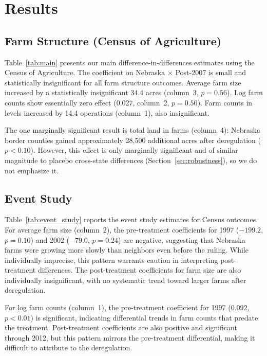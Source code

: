 \documentclass[12pt]{article}
\begin{document}
\section{Results}\label{sec:results}

\subsection{Farm Structure (Census of Agriculture)}

Table~\ref{tab:main} presents our main difference-in-differences estimates using the Census of Agriculture. The coefficient on Nebraska $\times$ Post-2007 is small and statistically insignificant for all farm structure outcomes. Average farm size increased by a statistically insignificant 34.4 acres (column~3, $p = 0.56$). Log farm counts show essentially zero effect (0.027, column~2, $p = 0.50$). Farm counts in levels increased by 14.4 operations (column~1), also insignificant.

The one marginally significant result is total land in farms (column~4): Nebraska border counties gained approximately 28,500 additional acres after deregulation ($p < 0.10$). However, this effect is only marginally significant and of similar magnitude to placebo cross-state differences (Section~\ref{sec:robustness}), so we do not emphasize it.



\subsection{Event Study}

Table~\ref{tab:event_study} reports the event study estimates for Census outcomes. For average farm size (column~2), the pre-treatment coefficients for 1997 ($-199.2$, $p = 0.10$) and 2002 ($-79.0$, $p = 0.24$) are negative, suggesting that Nebraska farms were growing more slowly than neighbors even before the ruling. While individually imprecise, this pattern warrants caution in interpreting post-treatment differences. The post-treatment coefficients for farm size are also individually insignificant, with no systematic trend toward larger farms after deregulation.

For log farm counts (column~1), the pre-treatment coefficient for 1997 ($0.092$, $p < 0.01$) is significant, indicating differential trends in farm counts that predate the treatment. Post-treatment coefficients are also positive and significant through 2012, but this pattern mirrors the pre-treatment differential, making it difficult to attribute to the deregulation.
\end{document}
